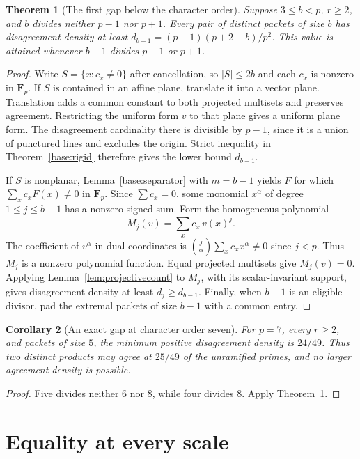 \documentclass[11pt,letterpaper]{article}
\newcommand{\Fp}{\mathbf F_p}
\newtheorem{theorem}{Theorem}[section]
\newtheorem{corollary}[theorem]{Corollary}
\theoremstyle{remark}
\begin{document}
\begin{theorem}[The first gap below the character order]\label{base:gap}
Suppose $3\le b<p$, $r\ge2$, and $b$ divides neither $p-1$ nor $p+1$.
Every pair of distinct packets of size $b$ has disagreement density at
least $d_{b-1}=(p-1)(p+2-b)/p^2$.  This value is attained whenever
$b-1$ divides $p-1$ or $p+1$.
\end{theorem}

\begin{proof}
Write $S=\{x:c_x\ne0\}$ after cancellation, so $|S|\le2b$ and each
$c_x$ is nonzero in $\Fp$.  If $S$ is contained in an affine plane,
translate it into a vector plane. Translation adds a common constant
to both projected multisets and preserves agreement. Restricting the
uniform form $v$ to that plane gives a uniform plane form. The
disagreement cardinality there is divisible by $p-1$, since it is a
union of punctured lines and excludes the origin. Strict inequality
in Theorem~\ref{base:rigid} therefore gives the lower bound $d_{b-1}$.

If $S$ is nonplanar, Lemma~\ref{base:separator} with $m=b-1$ yields
$F$ for which $\sum_xc_xF(x)\ne0$ in $\Fp$. Since $\sum c_x=0$,
some monomial $x^\alpha$ of degree $1\le j\le b-1$ has a nonzero
signed sum. Form the homogeneous polynomial
\[
 M_j(v)=\sum_xc_x\,v(x)^j.
\]
The coefficient of $v^\alpha$ in dual coordinates is
$\binom{j}{\alpha}\sum_xc_xx^\alpha\ne0$ since $j<p$. Thus
$M_j$ is a nonzero polynomial function. Equal projected multisets
give $M_j(v)=0$. Applying Lemma~\ref{lem:projectivecount} to $M_j$,
with its scalar-invariant support, gives disagreement density
at least $d_j\ge d_{b-1}$.  Finally, when $b-1$ is an eligible
divisor, pad the extremal packets of size $b-1$ with a common entry.
\end{proof}

\begin{corollary}[An exact gap at character order seven]\label{base:seven}
For $p=7$, every $r\ge2$, and packets of size $5$, the minimum positive
disagreement density is $24/49$. Thus two distinct products may agree
at $25/49$ of the unramified primes, and no larger agreement density
is possible.
\end{corollary}

\begin{proof}
Five divides neither $6$ nor $8$, while four divides $8$.
Apply Theorem~\ref{base:gap}.
\end{proof}
\section{Equality at every scale}
\end{document}
